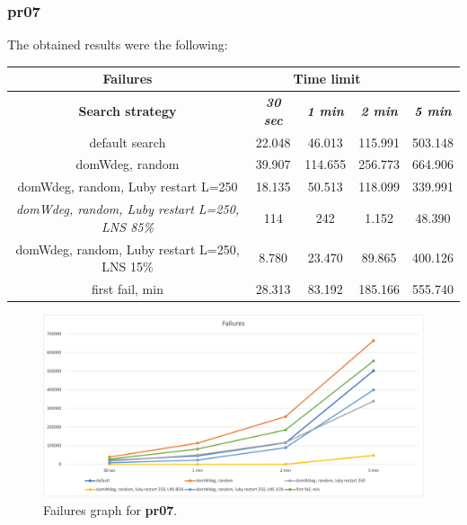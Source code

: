 \subsubsection{pr07}
\label{subsubsec:pr07}
The obtained results were the following:
{
\renewcommand{\arraystretch}{2}
\begin{longtable}[h]{| c | c | c | c | c |}
    \hline
    \textbf{Failures} & \multicolumn{3}{c}{Time limit} & \\
    \hline
    \textbf{Search strategy} & \textbf{\textit{30 sec}} & \textbf{\textit{1 min}} & \textbf{\textit{2 min}} & \textbf{\textit{5 min}} \\
    \hline
    \endhead
    default search                                         & 22.048 &  46.013 & 115.991 & 503.148 \\
    \hline
    domWdeg, random                                        & 39.907 & 114.655 & 256.773 & 664.906 \\
    \hline
    domWdeg, random, Luby restart L=250                    & 18.135 &  50.513 & 118.099 & 339.991 \\
    \hline
    \textit{domWdeg, random, Luby restart L=250, LNS 85\%} &   114 &    242 &   1.152 &  48.390 \\
    \hline
    domWdeg, random, Luby restart L=250, LNS 15\%          &  8.780 &  23.470 &  89.865 & 400.126 \\
    \hline
    first fail, min                                        & 28.313 &  83.192 & 185.166 & 555.740 \\
    \hline
\end{longtable}
}
\begin{figure}[H]
    \centering
    \includegraphics[width=0.8\columnwidth]{../graphs/pr07-failures.png}
    \caption{Failures graph for \textbf{pr07}.}
\end{figure}

